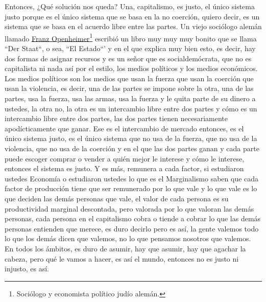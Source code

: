 Entonces, ¿Qué solución nos queda? Una, capitalismo, es justo, el único sistema justo porque es el único sistema que se basa en la no coerción, quiero decir, es un sistema que se basa en el acuerdo libre entre las partes. Un viejo sociólogo alemán llamado \href{https://en.wikipedia.org/wiki/Franz_Oppenheimer}{Franz Openheimer}\footnote{Sociólogo y economista político judío alemán.} escribió un libro muy muy muy bonito que se llama ``Der Staat``\cite{oppenheimer1908state}, o sea, ``El Estado``' y en el que explica muy bien esto, es decir, hay dos formas de asignar recursos y es un señor que es socialdemócrata, que no es capitalista ni nada así por el estilo, los medios políticos y los medios económicos. Los medios políticos son los medios que usan la fuerza que usan la coerción que usan la violencia, es decir, una de las partes se impone sobre la otra, una de las partes, usa la fuerza, usa las armas, usa la fuerza y le quita parte de su dinero a ustedes, la otra no, la otra es un intercambio libre entre dos partes y cómo es un intercambio libre entre dos partes, las dos partes tienen necesariamente apodícticamente que ganar. Ese es el intercambio de mercado entonces, es el único sistema justo, es el único sistema que no usa de la fuerza, que no usa de la violencia, que no usa de la coerción y en el que las dos partes ganan y cada parte puede escoger comprar o vender a quién mejor le interese y cómo le interese, entonces el sistema es justo. Y es más, remunera a cada factor, si estudiaron ustedes Economía o estudiaron ustedes lo que es el Marginalismo saben que cada factor de producción tiene que ser remunerado por lo que vale y lo que vale es lo que deciden las demás personas que vale, el valor de cada persona es su productividad marginal descontada, pero valorada por lo que valoran las demás personas, cada persona en el capitalismo cobra o tiende a cobrar lo que las demás personas entienden que merece, es duro decirlo pero es así, la gente valemos todo lo que los demás dicen que valemos, no lo que pensamos nosotros que valemos. En todos los ámbitos, es duro de asumir, hay que asumir, hay que agachar la cabeza, pero qué le vamos a hacer, es así el mundo, entonces no es justo ni injusto, es así.

